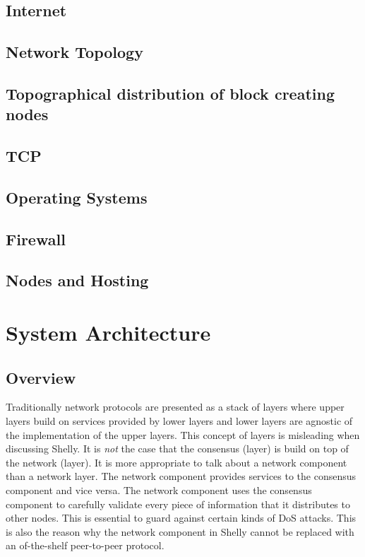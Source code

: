 \documentclass{report}
\theoremstyle{definition}{
  \newtheorem{lemma}{Lemma}[section] %
  \newtheorem{definition}[lemma]{Definition}
}
\theoremstyle{theorem}{
  \newtheorem{invariant}[lemma]{Invariant}
  \newtheorem{proofobligation}[lemma]{Proof Obligation}
}
\numberwithin{equation}{lemma}
\begin{document}
\section{Internet}
\section{Network Topology}
\section{Topographical distribution of block creating nodes}
\section{TCP}
\section{Operating Systems}
\section{Firewall}
\section{Nodes and Hosting}


\chapter{System Architecture}
\section{Overview}

Traditionally network protocols are presented as a stack of layers where
upper layers build on services provided by lower layers and lower layers
are agnostic of the implementation of the upper layers.
This concept of layers is misleading when discussing Shelly.
It is {\em not} the case that the consensus (layer) is build on top of the network (layer).
It is more appropriate to talk about a network component than a network layer.
The network component provides services to the consensus component and vice versa.
The network component uses the consensus component to carefully validate every piece of
information that it distributes to other nodes.
This is essential to guard against certain kinds of DoS attacks.
This is also the reason why the network component in Shelly cannot be replaced
with an of-the-shelf peer-to-peer protocol.
\end{document}
